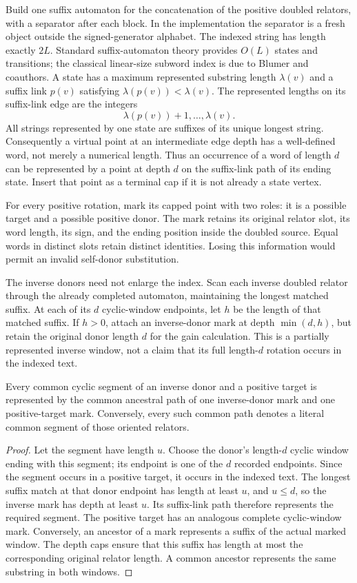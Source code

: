 Build one suffix automaton for the concatenation of the positive doubled
relators, with a separator after each block.  In the implementation the
separator is a fresh object outside the signed-generator alphabet.  The
indexed string has length exactly $2L$.  Standard suffix-automaton theory
provides $O(L)$ states and transitions; the classical linear-size subword
index is due to Blumer and coauthors.  A state has a maximum represented
substring length $\lambda(v)$ and a suffix link $p(v)$ satisfying
$\lambda(p(v))<\lambda(v)$.  The represented lengths on its suffix-link
edge are the integers
\[
 \lambda(p(v))+1,\ldots,\lambda(v).
\]
All strings represented by one state are suffixes of its unique longest
string.  Consequently a virtual point at an intermediate edge depth has
a well-defined word, not merely a numerical length.  Thus an occurrence
of a word of length $d$ can be represented by a point
at depth $d$ on the suffix-link path of its ending state.  Insert that
point as a terminal cap if it is not already a state vertex.

For every positive rotation, mark its capped point with two roles: it is
a possible target and a possible positive donor.  The mark retains its
original relator slot, its word length, its sign, and the ending position
inside the doubled source.  Equal words in distinct slots retain distinct
identities.  Losing this information would permit an invalid self-donor
substitution.

The inverse donors need not enlarge the index.  Scan each inverse doubled
relator through the already completed automaton, maintaining the longest
matched suffix.  At each of its $d$ cyclic-window endpoints, let $h$ be
the length of that matched suffix.  If $h>0$, attach an inverse-donor mark
at depth $\min(d,h)$, but retain the original donor length $d$ for the gain
calculation.  This is a partially represented inverse window, not a claim
that its full length-$d$ rotation occurs in the indexed text.

\begin{lemma}
Every common cyclic segment of an inverse donor and a positive target is
represented by the common ancestral path of one inverse-donor mark and one
positive-target mark.  Conversely, every such common path denotes a literal
common segment of those oriented relators.
\end{lemma}
\begin{proof}
Let the segment have length $u$.  Choose the donor's length-$d$ cyclic
window ending with this segment; its endpoint is one of the $d$ recorded
endpoints.  Since the segment occurs in a positive target, it occurs in
the indexed text.  The longest suffix match at that donor endpoint has
length at least $u$, and $u\le d$, so the inverse mark has depth at least
$u$.  Its suffix-link path therefore represents the required segment.
The positive target has an analogous complete cyclic-window mark.
Conversely, an ancestor of a mark represents a suffix of the actual marked
window.  The depth caps ensure that this suffix has length at most the
corresponding original relator length.  A common ancestor represents the
same substring in both windows.
\end{proof}

